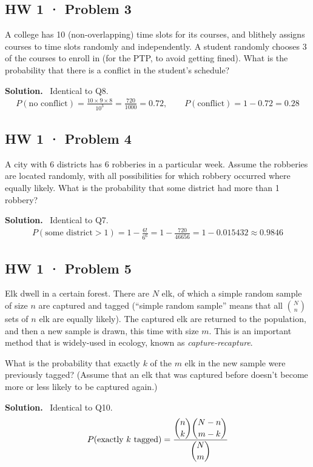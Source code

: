 \documentclass[11pt]{article}
\newcommand{\Sol}{\vspace{2pt}\noindent\textbf{Solution.}\ }
\begin{document}
\subsection{HW 1 · Problem 3}
\begin{qbox}
A college has 10 (non-overlapping) time slots for its courses, and blithely assigns courses to time slots randomly and independently. A student randomly chooses 3 of the courses to enroll in (for the PTP, to avoid getting fined). What is the probability that there is a conflict in the student's schedule?
\end{qbox}
\Sol
Identical to Q8.
\begin{align*}
P(\text{no conflict}) = \frac{10\times9\times8}{10^3} = \frac{720}{1000}=0.72, \qquad P(\text{conflict}) = 1-0.72 = 0.28
\end{align*}

\subsection{HW 1 · Problem 4}
\begin{qbox}
A city with 6 districts has 6 robberies in a particular week. Assume the robberies are located randomly, with all possibilities for which robbery occurred where equally likely. What is the probability that some district had more than 1 robbery?
\end{qbox}
\Sol
Identical to Q7.
\begin{align*}
P(\text{some district}>1) = 1-\frac{6!}{6^6} = 1-\frac{720}{46656} = 1-0.015432 \approx 0.9846
\end{align*}

\subsection{HW 1 · Problem 5}
\begin{qbox}
Elk dwell in a certain forest. There are $N$ elk, of which a simple random sample of size $n$ are captured and tagged (``simple random sample'' means that all $\binom{N}{n}$ sets of $n$ elk are equally likely). The captured elk are returned to the population, and then a new sample is drawn, this time with size $m$. This is an important method that is widely-used in ecology, known as \emph{capture-recapture}.

What is the probability that exactly $k$ of the $m$ elk in the new sample were previously tagged? (Assume that an elk that was captured before doesn't become more or less likely to be captured again.)
\end{qbox}
\Sol
Identical to Q10.
\begin{align*}
P(\text{exactly }k\text{ tagged}) = \frac{\dbinom{n}{k}\dbinom{N-n}{m-k}}{\dbinom{N}{m}}
\end{align*}
\end{document}
